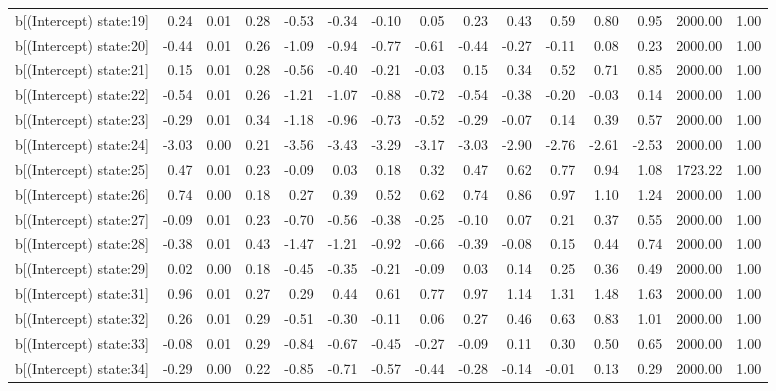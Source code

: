 \begin{table}[ht]
\begin{tabular}{rrrrrrrrrrrrrrr}
  b[(Intercept) state:19] & 0.24 & 0.01 & 0.28 & -0.53 & -0.34 & -0.10 & 0.05 & 0.23 & 0.43 & 0.59 & 0.80 & 0.95 & 2000.00 & 1.00 \\ 
  b[(Intercept) state:20] & -0.44 & 0.01 & 0.26 & -1.09 & -0.94 & -0.77 & -0.61 & -0.44 & -0.27 & -0.11 & 0.08 & 0.23 & 2000.00 & 1.00 \\ 
  b[(Intercept) state:21] & 0.15 & 0.01 & 0.28 & -0.56 & -0.40 & -0.21 & -0.03 & 0.15 & 0.34 & 0.52 & 0.71 & 0.85 & 2000.00 & 1.00 \\ 
  b[(Intercept) state:22] & -0.54 & 0.01 & 0.26 & -1.21 & -1.07 & -0.88 & -0.72 & -0.54 & -0.38 & -0.20 & -0.03 & 0.14 & 2000.00 & 1.00 \\ 
  b[(Intercept) state:23] & -0.29 & 0.01 & 0.34 & -1.18 & -0.96 & -0.73 & -0.52 & -0.29 & -0.07 & 0.14 & 0.39 & 0.57 & 2000.00 & 1.00 \\ 
  b[(Intercept) state:24] & -3.03 & 0.00 & 0.21 & -3.56 & -3.43 & -3.29 & -3.17 & -3.03 & -2.90 & -2.76 & -2.61 & -2.53 & 2000.00 & 1.00 \\ 
  b[(Intercept) state:25] & 0.47 & 0.01 & 0.23 & -0.09 & 0.03 & 0.18 & 0.32 & 0.47 & 0.62 & 0.77 & 0.94 & 1.08 & 1723.22 & 1.00 \\ 
  b[(Intercept) state:26] & 0.74 & 0.00 & 0.18 & 0.27 & 0.39 & 0.52 & 0.62 & 0.74 & 0.86 & 0.97 & 1.10 & 1.24 & 2000.00 & 1.00 \\ 
  b[(Intercept) state:27] & -0.09 & 0.01 & 0.23 & -0.70 & -0.56 & -0.38 & -0.25 & -0.10 & 0.07 & 0.21 & 0.37 & 0.55 & 2000.00 & 1.00 \\ 
  b[(Intercept) state:28] & -0.38 & 0.01 & 0.43 & -1.47 & -1.21 & -0.92 & -0.66 & -0.39 & -0.08 & 0.15 & 0.44 & 0.74 & 2000.00 & 1.00 \\ 
  b[(Intercept) state:29] & 0.02 & 0.00 & 0.18 & -0.45 & -0.35 & -0.21 & -0.09 & 0.03 & 0.14 & 0.25 & 0.36 & 0.49 & 2000.00 & 1.00 \\ 
  b[(Intercept) state:31] & 0.96 & 0.01 & 0.27 & 0.29 & 0.44 & 0.61 & 0.77 & 0.97 & 1.14 & 1.31 & 1.48 & 1.63 & 2000.00 & 1.00 \\ 
  b[(Intercept) state:32] & 0.26 & 0.01 & 0.29 & -0.51 & -0.30 & -0.11 & 0.06 & 0.27 & 0.46 & 0.63 & 0.83 & 1.01 & 2000.00 & 1.00 \\ 
  b[(Intercept) state:33] & -0.08 & 0.01 & 0.29 & -0.84 & -0.67 & -0.45 & -0.27 & -0.09 & 0.11 & 0.30 & 0.50 & 0.65 & 2000.00 & 1.00 \\ 
  b[(Intercept) state:34] & -0.29 & 0.00 & 0.22 & -0.85 & -0.71 & -0.57 & -0.44 & -0.28 & -0.14 & -0.01 & 0.13 & 0.29 & 2000.00 & 1.00 \\ 

\end{tabular}
\end{table}
